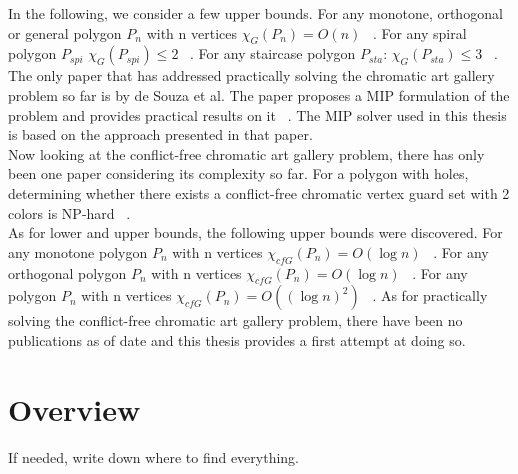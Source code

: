 In the following, we consider a few upper bounds.
For any monotone, orthogonal or general polygon $P_n$ with n vertices $\chi_G(P_n) = O(n)$ ~\cite{bartschi2011coloring}.
For any spiral polygon $P_{spi}$ $\chi_G(P_{spi}) \leq 2$ ~\cite{erickson2012art}.
For any staircase polygon $P_{sta}$: $\chi_G(P_{sta}) \leq 3$ ~\cite{erickson2012art}.\\
The only paper that has addressed practically solving the chromatic art gallery problem so far is by de Souza et al. The paper proposes a MIP formulation of the problem and provides practical results on it ~\cite{zambon2014exact}. The MIP solver used in this thesis is based on the approach presented in that paper.\\
Now looking at the conflict-free chromatic art gallery problem, there has only been one paper considering its complexity so far.
For a polygon with holes, determining whether there exists a conflict-free chromatic vertex guard set with 2 colors is NP-hard ~\cite{iwamoto2022vertex}.\\
As for lower and upper bounds, the following upper bounds were discovered.
For any monotone polygon $P_n$ with n vertices $\chi_{cfG}(P_n) = O(\log n)$ ~\cite{bartschi2011coloring}.
For any orthogonal polygon $P_n$ with n vertices $\chi_{cfG}(P_n) = O(\log n)$ ~\cite{bartschi2011coloring}.
For any polygon $P_n$ with n vertices $\chi_{cfG}(P_n) = O((\log n)^2)$ ~\cite{bartschi2011coloring}.
As for practically solving the conflict-free chromatic art gallery problem, there have been no publications as of date and this thesis provides a first attempt at doing so.


\section{Overview}
If needed, write down where to find everything.